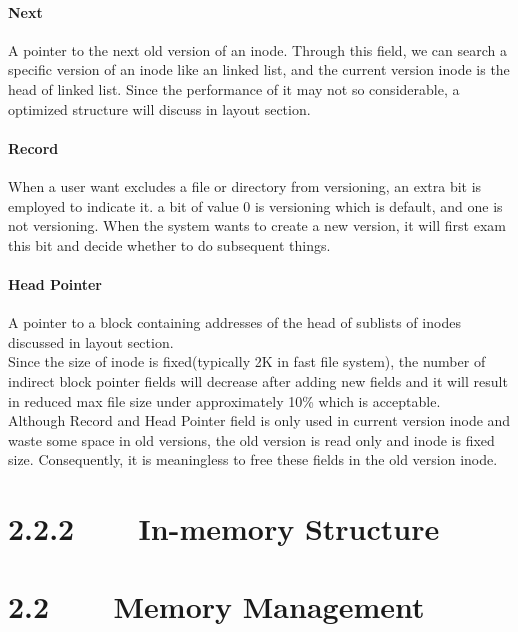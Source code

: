 \paragraph{Next}A pointer to the next old version of an inode. Through this field, we can search a specific version of an inode like an linked list, and the current version inode is the head of linked list. Since the performance of it may not so considerable, a optimized structure will discuss in layout section.
\paragraph{Record}When a user want excludes a file or directory from versioning, an extra bit is employed to indicate it. a bit of value 0 is versioning which is default, and one is not versioning. When the system wants to create a new version, it will first exam this bit and decide whether to do subsequent things.
\paragraph{Head Pointer}A pointer to a block containing addresses of the head of sublists of inodes discussed in layout section. \\[1em]
Since the size of inode  is fixed(typically 2K in fast file system), the number of indirect block pointer fields will decrease after adding new fields and it will result in reduced max file size under approximately 10\% which is acceptable.\\[1em]
Although Record and Head Pointer field is only used in current version inode and waste some space in old versions, the old version is read only and inode is fixed size. Consequently, it is meaningless to free these fields in the old version inode.
\section*{2.2.2~~~~In-memory Structure}

\section*{2.2~~~~Memory Management}
